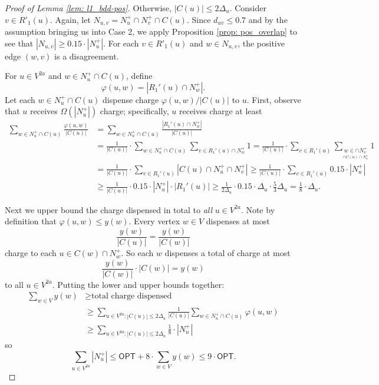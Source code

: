 \begin{proof}[Proof of Lemma \ref{lem: l1_bdd-pos}]
Otherwise, $|C(u)| \leq 2\Delta_u$.  Consider $v \in R'_1(u)$. Again, let $N_{u,v} = N_u^+ \cap N_v^+ \cap C(u)$. Since $d_{uv} \leq 0.7$ and by the assumption bringing us into Case 2, we apply Proposition \ref{prop: pos_overlap} to see that $|N_{u,v}| \geq 0.15 \cdot |N_u^+|$. 
For each $v \in R'_1(u)$ and $w \in N_{u,v}$, the positive edge $(w,v)$ is a disagreement. 


   For $u \in  V^{2a}$ and $w \in N_u^+ \cap C(u)$, define 
    $$\varphi(u,w) = |R_1'(u)\cap N_w^+  |.$$
    Let each $w \in N_u^+ \cap C(u)$ dispense charge $\varphi(u,w)/|C(u)|$ to $u$.
First, observe that $u$ receives $\Omega(|N_u^+|)$ charge; specifically, $u$ receives charge  at least 
 \begin{align*}
    \sum_{w \in N_u^+ \cap C(u)} \frac{\varphi(u,w)}{|C(u)|}
    &= \sum_{w \in N_u^+ \cap C(u)} \frac{|R_1'(u)  \cap N_w^+|}{|C(u)|}  \\
       & = \frac{1}{|C(u)|}\cdot\sum_{w \in N_u^+ \cap C(u)} \sum_{v \in R_1'(u)  \cap N_w^+} 1  
    = \frac{1}{|C(u)|}\cdot\sum_{v \in R_1'(u)} \sum_{\underset{ \cap C(u) \cap N_u^+}     {w \in  \cap N_v^+}} 1 \\
        &= \frac{1}{|C(u)|}\cdot\sum_{v \in R_1'(u)} | C(u) \cap N_u^+ \cap N_v^+| \geq 
        \frac{1}{|C(u)|}\cdot\sum_{v \in R_1'(u)} 0.15\cdot | N_u^+ | \\
    &\geq \frac{1}{|C(u)|}\cdot 0.15 \cdot |N_u^+| \cdot |R_1'(u)| \geq \frac{1}{2\Delta_u}\cdot 0.15 \cdot \Delta_u \cdot \frac{5}{3}\Delta_u = \frac{1}{8} \cdot \Delta_u.
 \end{align*}


Next we upper bound the charge dispensed in total to \emph{all} $u \in V^{2a}$. Note by definition that $\varphi(u,w) \leq y(w)$. Every vertex $w \in V$ dispenses at most
    $$\frac{y(w)}{|C(u)|} = \frac{y(w)}{|C(w)|}$$
    charge to each $u \in C(w) \cap N_w^+$. 
    So each $w$ dispenses a total of charge at most 
    \[\frac{y(w)}{|C(w)|} \cdot |C(w)| = y(w)\]
     to all $u \in V^{2a}$. 
    Putting the lower and upper bounds together:  
    \begin{align*}
        \sum_{w \in V} y(w) &\geq \text{total charge dispensed} \\
        &\geq \sum_{u \in  V^{2a}: |C(u)| \leq 2\Delta_u} \frac{1}{|C(u)|} \sum_{w \in N_u^+ \cap C(u)} \varphi(u,w) \\
        &\geq \sum_{u \in  V^{2a}: |C(u)| \leq 2\Delta_u} \frac{1}{8} \cdot |N_u^+|
    \end{align*}
    so 
    \[\boxed{\sum_{u \in  V^{2a}} |N_u^+| \leq \textsf{OPT} + 8  \cdot \sum_{w \in V} y(w) \leq 9 \cdot \textsf{OPT}.}\]


\end{proof}
